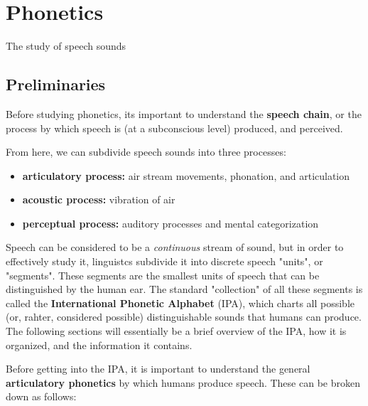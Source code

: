 \documentclass[12pt]{article}
\begin{document}
\section{Phonetics}

\begin{definitionEnd}[Phonetics]
  The study of speech sounds
\end{definitionEnd}
\subsection{Preliminaries}

Before studying phonetics, its important to understand the \textbf{speech chain}, or the process by which speech is (at a subconscious level) produced, and perceived.


From here, we can subdivide speech sounds into three processes:

\begin{itemize}
  \item \textbf{articulatory process:} air stream movements, phonation, and articulation
  \item \textbf{acoustic process:} vibration of air
  \item \textbf{perceptual process:} auditory processes and mental categorization
\end{itemize}

Speech can be considered to be a \textit{continuous} stream of sound, but in order to effectively study it, linguistcs subdivide it into discrete speech "units", or "segments". These segments are the smallest units of speech that can be distinguished by the human ear. The standard "collection" of all these segments is called the \textbf{International Phonetic Alphabet} (IPA), which charts all possible (or, rahter, considered possible) distinguishable sounds that humans can produce. The following sections will essentially be a brief overview of the IPA, how it is organized, and the information it contains. 

Before getting into the IPA, it is important to understand the general \textbf{articulatory phonetics} by which humans produce speech. These can be broken down as follows:
\end{document}
